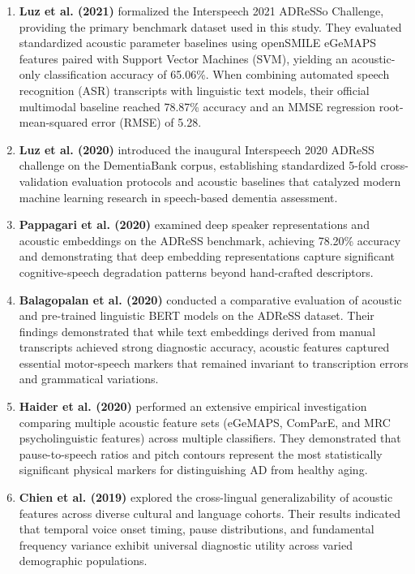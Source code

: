 \documentclass[conference]{IEEEtran}
\begin{document}
\begin{enumerate}
    \item \textbf{Luz et al. (2021)} \cite{luz2021adresso} formalized the Interspeech 2021 ADReSSo Challenge, providing the primary benchmark dataset used in this study. They evaluated standardized acoustic parameter baselines using openSMILE eGeMAPS features paired with Support Vector Machines (SVM), yielding an acoustic-only classification accuracy of 65.06\%. When combining automated speech recognition (ASR) transcripts with linguistic text models, their official multimodal baseline reached 78.87\% accuracy and an MMSE regression root-mean-squared error (RMSE) of 5.28.
    
    \item \textbf{Luz et al. (2020)} \cite{luz2020adresso} introduced the inaugural Interspeech 2020 ADReSS challenge on the DementiaBank corpus, establishing standardized 5-fold cross-validation evaluation protocols and acoustic baselines that catalyzed modern machine learning research in speech-based dementia assessment.
    
    \item \textbf{Pappagari et al. (2020)} \cite{papasavvas2021wav2vec} examined deep speaker representations and acoustic embeddings on the ADReSS benchmark, achieving 78.20\% accuracy and demonstrating that deep embedding representations capture significant cognitive-speech degradation patterns beyond hand-crafted descriptors.
    
    \item \textbf{Balagopalan et al. (2020)} \cite{balagopalan2020comparing} conducted a comparative evaluation of acoustic and pre-trained linguistic BERT models on the ADReSS dataset. Their findings demonstrated that while text embeddings derived from manual transcripts achieved strong diagnostic accuracy, acoustic features captured essential motor-speech markers that remained invariant to transcription errors and grammatical variations.
    
    \item \textbf{Haider et al. (2020)} \cite{haider2020assessment} performed an extensive empirical investigation comparing multiple acoustic feature sets (eGeMAPS, ComParE, and MRC psycholinguistic features) across multiple classifiers. They demonstrated that pause-to-speech ratios and pitch contours represent the most statistically significant physical markers for distinguishing AD from healthy aging.
    
    \item \textbf{Chien et al. (2019)} \cite{chien2019acoustic} explored the cross-lingual generalizability of acoustic features across diverse cultural and language cohorts. Their results indicated that temporal voice onset timing, pause distributions, and fundamental frequency variance exhibit universal diagnostic utility across varied demographic populations.
    

\end{enumerate}
\end{document}
